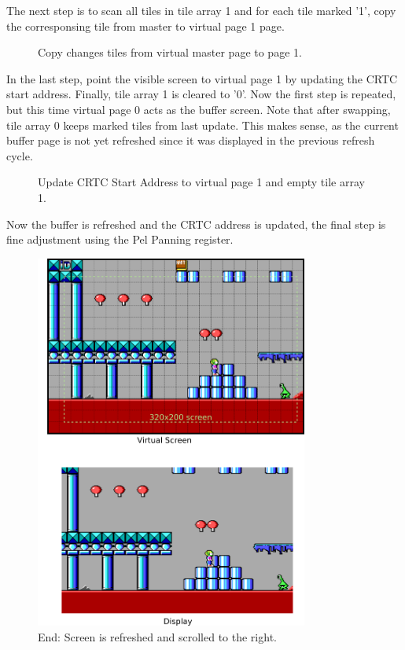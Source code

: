 \documentclass[book.tex]{subfiles}
\begin{document}
\pagebreak
The next step is to scan all tiles in tile array 1 and for each tile marked '1', copy the corresponsing tile from master to virtual page 1 page.\\
\begin{figure}[H]
\centering
 \caption{Copy changes tiles from virtual master page to page 1.}
 \label{fig:kc1_3_step2}
\end{figure}


\pagebreak
In the last step, point the visible screen to virtual page 1 by updating the CRTC start address. Finally, tile array 1 is cleared to '0'. Now the first step is repeated, but this time virtual page 0 acts as the buffer screen. Note that after swapping, tile array 0 keeps marked tiles from last update. This makes sense, as the current buffer page is not yet refreshed since it was displayed in the previous refresh cycle. 

\begin{figure}[H]
\centering
 \caption{Update CRTC Start Address to virtual page 1 and empty tile array 1.}
 \label{fig:kc1_3_step2}
\end{figure}

\pagebreak

Now the buffer is refreshed and the CRTC address is updated, the final step is fine adjustment using the Pel Panning register.
\begin{figure}[H]
\centering
 \includegraphics[width=0.8\textwidth]{screenshots_300dpi/game/Keen_ATR_1-3_b.png}
 \caption{End: Screen is refreshed and scrolled to the right.}
 \label{fig:kc1_3_start}
\end{figure}
\end{document}
